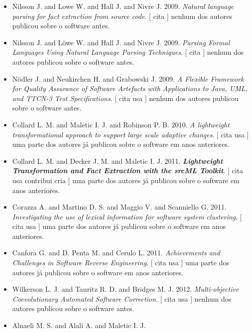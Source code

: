 \begin{itemize}
      [
          cita
      ]
uma parte dos autores já publicou sobre o software em anos anteriores.
\item Nilsson J. and Lowe W. and Hall J. and Nivre J.
      2009.
        \textit{ Natural language parsing for fact extraction from source code}.
      [
          cita
      ]
nenhum dos autores publicou sobre o software antes.
\item Nilsson J. and L\"{o}we W. and Hall J. and Nivre J.
      2009.
        \textit{ Parsing Formal Languages Using Natural Language Parsing Techniques}.
      [
          cita
      ]
nenhum dos autores publicou sobre o software antes.
\item Nödler J. and Neukirchen H. and Grabowski J.
      2009.
        \textit{ A Flexible Framework for Quality Assurance of Software Artefacts with Applications to Java, UML, and TTCN-3 Test Specifications}.
      [
          cita
          usa
      ]
nenhum dos autores publicou sobre o software antes.
\item Collard L. M. and Maletic I. J. and Robinson P. B.
      2010.
        \textit{ A lightweight transformational approach to support large scale adaptive changes}.
      [
          cita
          usa
      ]
uma parte dos autores já publicou sobre o software em anos anteriores.
\item Collard L. M. and Decker J. M. and Maletic I. J.
      2011.
        \textbf{\textit{ Lightweight Transformation and Fact Extraction with the srcML Toolkit}}.
      [
          cita
          usa
          contribui
          cria
      ]
uma parte dos autores já publicou sobre o software em anos anteriores.
\item Corazza A. and Martino D. S. and Maggio V. and Scanniello G.
      2011.
        \textit{ Investigating the use of lexical information for software system clustering}.
      [
          cita
          usa
      ]
uma parte dos autores já publicou sobre o software em anos anteriores.
\item Canfora G. and D. Penta M. and Cerulo L.
      2011.
        \textit{ Achievements and Challenges in Software Reverse Engineering}.
      [
          cita
          usa
      ]
uma parte dos autores já publicou sobre o software em anos anteriores.
\item Wilkerson L. J. and Tauritz R. D. and Bridges M. J.
      2012.
        \textit{ Multi-objective Coevolutionary Automated Software Correction}.
      [
          cita
          usa
      ]
nenhum dos autores publicou sobre o software antes.
\item Alnaeli M. S. and Alali A. and Maletic I. J.

\end{itemize}
